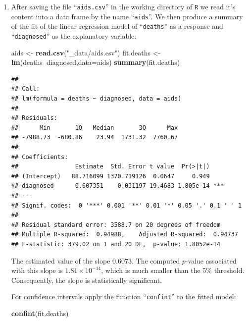 \documentclass[]{krantz}
\makeatletter
\newenvironment{Shaded}{\begin{snugshade}}{\end{snugshade}}
\newcommand{\KeywordTok}[1]{\textcolor[rgb]{0.13,0.29,0.53}{\textbf{#1}}}
\newcommand{\DataTypeTok}[1]{\textcolor[rgb]{0.13,0.29,0.53}{#1}}
\newcommand{\StringTok}[1]{\textcolor[rgb]{0.31,0.60,0.02}{#1}}
\newcommand{\OperatorTok}[1]{\textcolor[rgb]{0.81,0.36,0.00}{\textbf{#1}}}
\newcommand{\NormalTok}[1]{#1}
\newenvironment{kframe}{%
\medskip{}
\setlength{\fboxsep}{.8em}
 \def\at@end@of@kframe{}%
 \ifinner\ifhmode%
  \def\at@end@of@kframe{\end{minipage}}%
  \begin{minipage}{\columnwidth}%
 \fi\fi%
 \def\FrameCommand##1{\hskip\@totalleftmargin \hskip-\fboxsep
 \colorbox{shadecolor}{##1}\hskip-\fboxsep
     \hskip-\linewidth \hskip-\@totalleftmargin \hskip\columnwidth}%
 \MakeFramed {\advance\hsize-\width
   \@totalleftmargin\z@ \linewidth\hsize
   \@setminipage}}%
 {\par\unskip\endMakeFramed%
 \at@end@of@kframe}
\renewenvironment{Shaded}{\begin{kframe}}{\end{kframe}}
\theoremstyle{definition}
\theoremstyle{definition}
\theoremstyle{definition}
\theoremstyle{remark}
\makeatother
\begin{document}
\begin{enumerate}
\def\labelenumi{\arabic{enumi}.}
\setcounter{enumi}{1}
\item
  After saving the file ``\texttt{aids.csv}'' in the working directory
  of \texttt{R} we read it's content into a data frame by the name
  ``\texttt{aids}''. We then produce a summary of the fit of the linear
  regression model of ``\texttt{deaths}'' as a response and
  ``\texttt{diagnosed}'' as the explanatory variable:

\begin{Shaded}
\begin{Highlighting}[]
\NormalTok{aids <-}\StringTok{ }\KeywordTok{read.csv}\NormalTok{(}\StringTok{"_data/aids.csv"}\NormalTok{)}
\NormalTok{fit.deaths <-}\StringTok{ }\KeywordTok{lm}\NormalTok{(deaths}\OperatorTok{~}\NormalTok{diagnosed,}\DataTypeTok{data=}\NormalTok{aids)}
\KeywordTok{summary}\NormalTok{(fit.deaths)}
\end{Highlighting}
\end{Shaded}

\begin{verbatim}
## 
## Call:
## lm(formula = deaths ~ diagnosed, data = aids)
## 
## Residuals:
##      Min       1Q   Median       3Q      Max 
## -7988.73  -680.86    23.94  1731.32  7760.67 
## 
## Coefficients:
##                Estimate  Std. Error t value  Pr(>|t|)    
## (Intercept)   88.716099 1370.719126  0.0647     0.949    
## diagnosed      0.607351    0.031197 19.4683 1.805e-14 ***
## ---
## Signif. codes:  0 '***' 0.001 '**' 0.01 '*' 0.05 '.' 0.1 ' ' 1
## 
## Residual standard error: 3588.7 on 20 degrees of freedom
## Multiple R-squared:  0.94988,    Adjusted R-squared:  0.94737 
## F-statistic: 379.02 on 1 and 20 DF,  p-value: 1.8052e-14
\end{verbatim}

  The estimated value of the slope 0.6073. The computed \(p\)-value
  associated with this slope is \(1.81 \times 10^{-14}\), which is much
  smaller than the 5\% threshold. Consequently, the slope is
  statistically significant.

  For confidence intervals apply the function ``\texttt{confint}'' to
  the fitted model:

\begin{Shaded}
\begin{Highlighting}[]
\KeywordTok{confint}\NormalTok{(fit.deaths)}
\end{Highlighting}
\end{Shaded}


\end{enumerate}
\end{document}
